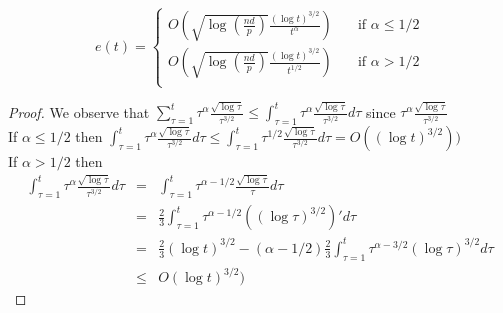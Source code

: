 \begin{lemma}
\[
e(t) =
     \begin{cases}
       O(\sqrt{\log(\frac{nd}{p})}\frac{(\log t)^{3/2}}{t^\alpha}) &\quad\text{if } \alpha \leq 1/2\\
       O(\sqrt{\log(\frac{nd}{p})}\frac{(\log t)^{3/2}}{t^{1/2}}) &\quad\text{if } \alpha > 1/2\\
       \end{cases}
\]

\end{lemma}
\begin{proof}
We observe that $\sum_{\tau=1}^t\tau^\alpha\frac{\sqrt{\log \tau}}{\tau^{3/2}} \leq \int_{\tau=1}^t \tau^\alpha\frac{\sqrt{\log \tau}}{\tau^{3/2}}d\tau$ since $\tau^\alpha\frac{\sqrt{\log \tau}}{\tau^{3/2}}$\\
If $\alpha\leq 1/2$ then $\int_{\tau=1}^t \tau^\alpha\frac{\sqrt{\log \tau}}{\tau^{3/2}}d\tau \leq \int_{\tau=1}^t \tau^{1/2}\frac{\sqrt{\log \tau}}{\tau^{3/2}}d\tau = O((\log t)^{3/2}))$\\

\noindent If $\alpha> 1/2$ then\\

\begin{eqnarray*}
\int_{\tau=1}^t \tau^\alpha\frac{\sqrt{\log \tau}}{\tau^{3/2}}d\tau &=& \int_{\tau=1}^t \tau^{\alpha-1/2}\frac{\sqrt{\log \tau}}{\tau}d\tau\\
&=& \frac{2}{3} \int_{\tau=1}^t \tau^{\alpha-1/2}((\log \tau)^{3/2})'d\tau\\
&=& \frac{2}{3}(\log t)^{3/2} - (\alpha-1/2)\frac{2}{3} \int_{\tau=1}^t \tau^{\alpha-3/2}(\log \tau)^{3/2}d\tau\\
&\leq& O(\log t)^{3/2})
\end{eqnarray*}


\end{proof}




